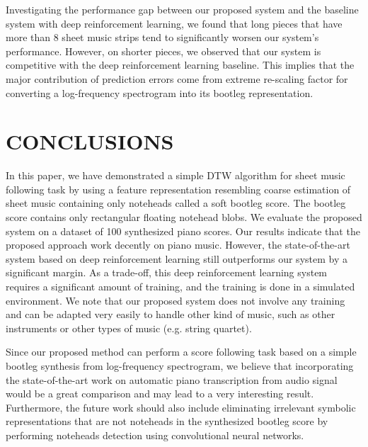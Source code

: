 \documentclass[letterpaper, 10pt, conference]{ieeeconf}  %
\begin{document}
Investigating the performance gap between our proposed system and the baseline system with deep reinforcement learning, we found that long pieces that have more than 8 sheet music strips tend to significantly worsen our system's performance. However, on shorter pieces, we observed that our system is competitive with the deep reinforcement learning baseline. This implies that the major contribution of prediction errors come from extreme re-scaling factor for converting a log-frequency spectrogram into its bootleg representation.

\section{CONCLUSIONS}
In this paper, we have demonstrated a simple DTW algorithm for sheet music following task by using a feature representation resembling coarse estimation of sheet music containing only noteheads called a soft bootleg score. The bootleg score contains only rectangular floating notehead blobs. We evaluate the proposed system on a dataset of 100 synthesized piano scores. Our results indicate that the proposed approach work decently on piano music. However, the state-of-the-art system based on deep reinforcement learning still outperforms our system by a significant margin. As a trade-off, this deep reinforcement learning system requires a significant amount of training, and the training is done in a simulated environment. We note that our proposed system does not involve any training and can be adapted very easily to handle other kind of music, such as other instruments or other types of music (e.g. string quartet).

Since our proposed method can perform a score following task based on a simple bootleg synthesis from log-frequency spectrogram, we believe that incorporating the state-of-the-art work on automatic piano transcription from audio signal would be a great comparison and may lead to a very interesting result. Furthermore, the future work should also include eliminating irrelevant symbolic representations that are not noteheads in the synthesized bootleg score by performing noteheads detection using convolutional neural networks.



\addtolength{\textheight}{-12cm}   %
\end{document}
